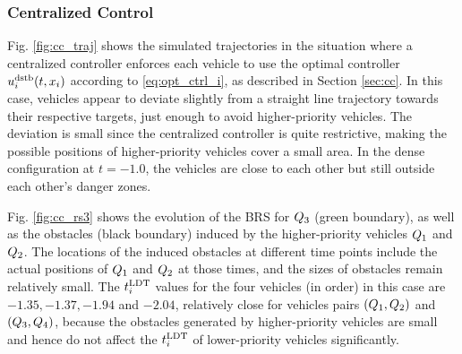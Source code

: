 \subsubsection{Centralized Control}
Fig. \ref{fig:cc_traj} shows the simulated trajectories in the situation where a centralized controller enforces each vehicle to use the optimal controller $u^\text{dstb}_i(t, x_i)$ according to \eqref{eq:opt_ctrl_i}, as described in Section \ref{sec:cc}. In this case, vehicles appear to deviate slightly from a straight line trajectory towards their respective targets, just enough to avoid higher-priority vehicles. The deviation is small since the centralized controller is quite restrictive, making the possible positions of higher-priority vehicles cover a small area. In the dense configuration at $t=-1.0$, the vehicles are close to each other but still outside each other's danger zones.

Fig. \ref{fig:cc_rs3} shows the evolution of the BRS for $Q_3$ (green boundary), as well as the obstacles (black boundary) induced by the higher-priority vehicles $Q_1$ and $Q_2$. The locations of the induced obstacles at different time points include the actual positions of $Q_1$ and $Q_2$ at those times, and the sizes of obstacles remain relatively small. The $t^\text{LDT}_i$ values for the four vehicles (in order) in this case are $-1.35, -1.37, -1.94$ and $-2.04$, relatively close for vehicles pairs $(Q_1, Q_2)$ and $(Q_3, Q_4)$, because the obstacles generated by higher-priority vehicles are small and hence do not affect the $t^\text{LDT}_i$ of lower-priority vehicles significantly.

